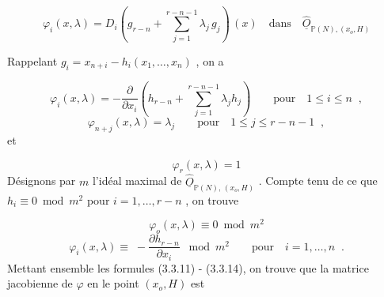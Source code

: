 \begin{equation}\tag{3.3.9}
\varphi_i(x,\lambda) = D_i(g_{r-n}+ \sum_{j=1}^{r-n-1} \lambda_j\, g_j)\, (x) \quad \mbox{dans} \quad \hat{\underline{O}}_{\mathbb{P}(N),(x_o,H)}
\end{equation}


Rappelant  $g_i = x_{n+i} - h_i(x_1,\dots,x_n)$  , on a

\begin{equation}\tag{3.3.10}
\varphi_i(x,\lambda)= -\frac{\partial}{\partial x_i}\left(h_{r-n} + \sum_{j=1}^{r-n-1} \lambda_j h_j\right) \qquad \mbox{pour} \quad 1 \leq i \leq n \;\; ,
\end{equation}
\begin{equation}\tag{3.3.11}
\varphi_{n+j}(x,\lambda) = \lambda_j \qquad \mbox{pour} \quad 1 \leq j \leq r-n-1 \;\; ,
\end{equation}
et

\begin{equation}\tag{3.3.12}
\varphi_r(x,\lambda) = 1
\end{equation}
Désignons par  $m$  l'idéal maximal de  $\hat{\underline{O}}_{\mathbb{P}(N),\,(x_o,H)}$  . Compte tenu de ce que  $h_i \equiv 0 \bmod m^2$  pour  $i = 1,\dots,r-n$  , on trouve

\begin{equation}\tag{3.3.13}
\varphi_o(x,\lambda) \equiv 0 \bmod m^2
\end{equation}
\begin{equation}\tag{3.3.14}
\varphi_i(x,\lambda) \equiv \; -\frac{\partial h_{r-n}}{\partial x_i} \; \bmod m^2 \qquad \mbox{pour} \quad i=1,\dots,n \;\; .
\end{equation}
Mettant ensemble les formules (3.3.11) - (3.3.14), on trouve que la matrice jacobienne de  $\varphi$ en le point  $(x_o,H)$  est 



